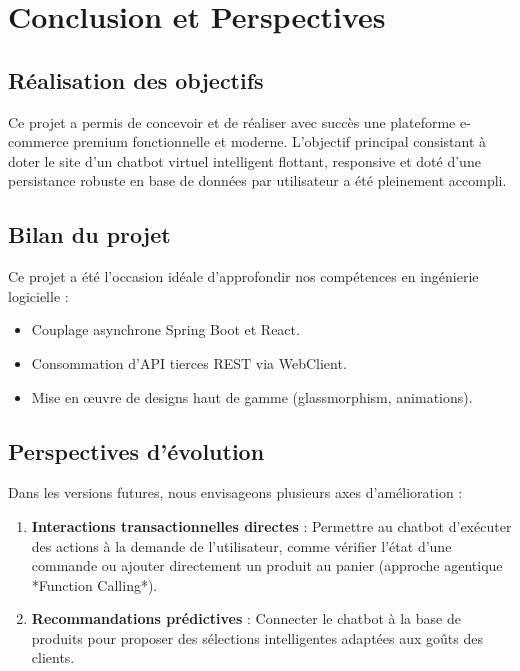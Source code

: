\documentclass[12pt,a4paper,oneside]{report}
\begin{document}
\chapter*{Conclusion et Perspectives}

\section*{Réalisation des objectifs}
Ce projet a permis de concevoir et de réaliser avec succès une plateforme e-commerce premium fonctionnelle et moderne. L'objectif principal consistant à doter le site d'un chatbot virtuel intelligent flottant, responsive et doté d'une persistance robuste en base de données par utilisateur a été pleinement accompli.

\section*{Bilan du projet}
Ce projet a été l'occasion idéale d'approfondir nos compétences en ingénierie logicielle :
\begin{itemize}
    \item Couplage asynchrone Spring Boot et React.
    \item Consommation d'API tierces REST via WebClient.
    \item Mise en œuvre de designs haut de gamme (glassmorphism, animations).
\end{itemize}

\section*{Perspectives d'évolution}
Dans les versions futures, nous envisageons plusieurs axes d'amélioration :
\begin{enumerate}
    \item \textbf{Interactions transactionnelles directes} : Permettre au chatbot d'exécuter des actions à la demande de l'utilisateur, comme vérifier l'état d'une commande ou ajouter directement un produit au panier (approche agentique *Function Calling*).
    \item \textbf{Recommandations prédictives} : Connecter le chatbot à la base de produits pour proposer des sélections intelligentes adaptées aux goûts des clients.
\end{enumerate}
\end{document}
